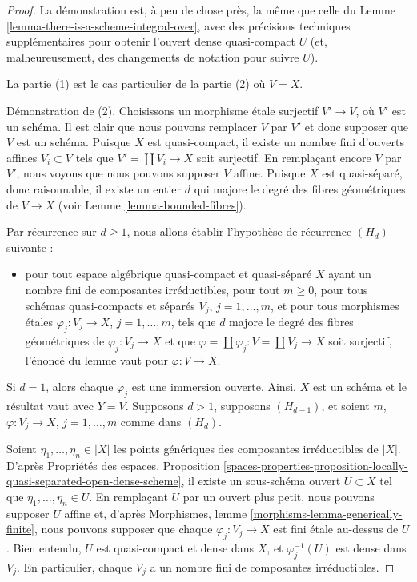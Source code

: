 \begin{proof}
La démonstration est, à peu de chose près, la même que celle du
Lemme \ref{lemma-there-is-a-scheme-integral-over}, avec des précisions
techniques supplémentaires pour obtenir l'ouvert dense quasi-compact $U$
(et, malheureusement, des changements de notation pour suivre $U$).

\medskip\noindent
La partie (1) est le cas particulier de la partie (2) où $V = X$.

\medskip\noindent
Démonstration de (2). Choisissons un morphisme étale surjectif $V' \to V$,
où $V'$ est un schéma. Il est clair que nous pouvons remplacer $V$ par $V'$
et donc supposer que $V$ est un schéma. Puisque $X$ est quasi-compact, il
existe un nombre fini d'ouverts affines $V_i \subset V$ tels que
$V' = \coprod V_i \to X$ soit surjectif. En remplaçant encore $V$ par $V'$,
nous voyons que nous pouvons supposer $V$ affine. Puisque $X$ est
quasi-séparé, donc raisonnable, il existe un entier $d$ qui majore le degré
des fibres géométriques de $V \to X$
(voir Lemme \ref{lemma-bounded-fibres}).

\medskip\noindent
Par récurrence sur $d \geq 1$, nous allons établir l'hypothèse de récurrence
$(H_d)$ suivante :
\begin{itemize}
\item pour tout espace algébrique quasi-compact et quasi-séparé $X$ ayant
un nombre fini de composantes irréductibles, pour tout $m \geq 0$, pour tous
schémas quasi-compacts et séparés $V_j$, $j = 1, \ldots, m$, et pour tous
morphismes étales $\varphi_j : V_j \to X$, $j = 1, \ldots, m$, tels que $d$
majore le degré des fibres géométriques de $\varphi_j : V_j\to X$ et que
$\varphi = \coprod \varphi_j : V = \coprod V_j \to X$ soit surjectif,
l'énoncé du lemme vaut pour $\varphi : V \to X$.
\end{itemize}
Si $d = 1$, alors chaque $\varphi_j$ est une immersion ouverte. Ainsi, $X$
est un schéma et le résultat vaut avec $Y = V$.
Supposons $d > 1$, supposons $(H_{d - 1})$, et soient
$m$, $\varphi : V_j \to X$, $j = 1, \ldots, m$ comme dans $(H_d)$.

\medskip\noindent
Soient $\eta_1, \ldots, \eta_n \in |X|$ les points génériques des
composantes irréductibles de $|X|$. D'après
Propriétés des espaces, Proposition
\ref{spaces-properties-proposition-locally-quasi-separated-open-dense-scheme},
il existe un sous-schéma ouvert $U \subset X$ tel que
$\eta_1, \ldots, \eta_n \in U$. En remplaçant $U$ par un ouvert plus petit,
nous pouvons supposer $U$ affine et, d'après
Morphismes, lemme \ref{morphisms-lemma-generically-finite},
nous pouvons supposer que chaque $\varphi_j : V_j \to X$ est fini étale
au-dessus de $U$. Bien entendu, $U$ est quasi-compact et dense dans $X$,
et $\varphi_j^{-1}(U)$ est dense dans $V_j$. En particulier, chaque $V_j$
a un nombre fini de composantes irréductibles.


\end{proof}
